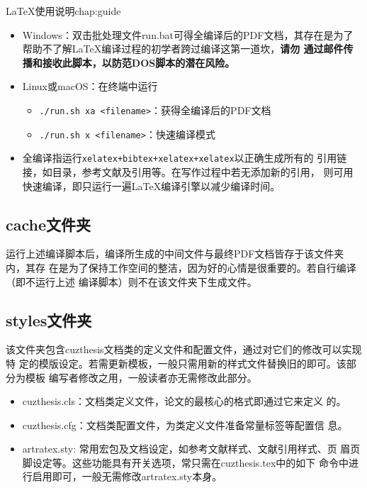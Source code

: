 \begin{cuzchapter}{\LaTeX{}使用说明}{chap:guide}
	\begin{itemize}
		\item Windows：双击批处理文件run.bat可得全编译后的PDF文档，其存在是为了
		      帮助不了解\LaTeX{}编译过程的初学者跨过编译这第一道坎，\textbf{请勿
			      通过邮件传播和接收此脚本，以防范DOS脚本的潜在风险。}
		\item Linux或macOS：在终端中运行
		      \begin{itemize}
			      \item \verb|./run.sh xa <filename>|：获得全编译后的PDF文档
			      \item \verb|./run.sh x <filename>|：快速编译模式
		      \end{itemize}
		\item 全编译指运行\verb|xelatex+bibtex+xelatex+xelatex|以正确生成所有的
		      引用链接，如目录，参考文献及引用等。在写作过程中若无添加新的引用，
		      则可用快速编译，即只运行一遍\LaTeX{}编译引擎以减少编译时间。
	\end{itemize}

	\subsection{cache文件夹}\label{sub:cache}

	运行上述编译脚本后，编译所生成的中间文件与最终PDF文档皆存于该文件夹内，其存
	在是为了保持工作空间的整洁，因为好的心情是很重要的。若自行编译（即不运行上述
	编译脚本）则不在该文件夹下生成文件。

	\subsection{styles文件夹}\label{sub:styles}

	该文件夹包含cuzthesis文档类的定义文件和配置文件，通过对它们的修改可以实现特
	定的模版设定。若需更新模板，一般只需用新的样式文件替换旧的即可。该部分为模板
	编写者修改之用，一般读者亦无需修改此部分。

	\begin{itemize}
		\item cuzthesis.cls：文档类定义文件，论文的最核心的格式即通过它来定义
		      的。
		\item cuzthesis.cfg：文档类配置文件，为类定义文件准备常量标签等配置信
		      息。
		\item artratex.sty: 常用宏包及文档设定，如参考文献样式、文献引用样式、页
		      眉页脚设定等。这些功能具有开关选项，常只需在cuzthesis.tex中的如下
		      命令中进行启用即可，一般无需修改artratex.sty本身。


\end{itemize}
\end{cuzchapter}
